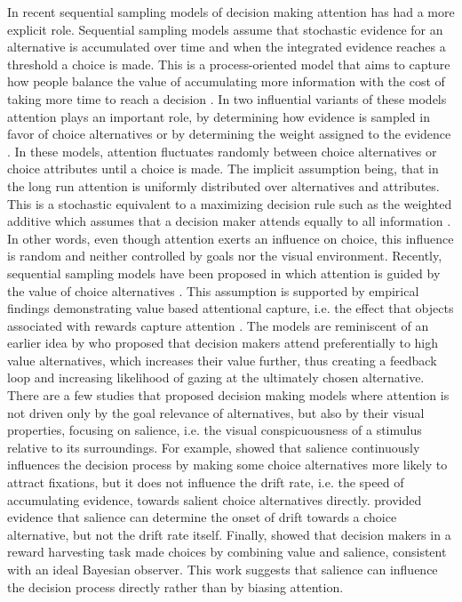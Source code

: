 \documentclass[english,natbib,man,floatsintext]{apa6}
\begin{document}
In recent sequential sampling models of decision making attention has had a more explicit role. Sequential sampling models assume that stochastic evidence for an alternative is accumulated over time and when the integrated evidence reaches a threshold a choice is made. This is a process-oriented model that aims to capture how people balance the value of accumulating more information with the cost of taking more time to reach a decision \citep{forstmann2016}. In two influential variants of these models attention plays an important role, by determining how evidence is sampled in favor of choice alternatives \citep{busemeyer1992} or by determining the weight assigned to the evidence \citep{krajbich2010a, thomas2019}. In these models, attention fluctuates randomly between choice alternatives or choice attributes until a choice is made. The implicit assumption being, that in the long run attention is uniformly distributed over alternatives and attributes. This is a stochastic equivalent to a maximizing decision rule such as the weighted additive which assumes that a decision maker attends equally to all information \cite{gloeckner2011a, payne1988}. In other words, even though attention exerts an influence on choice, this influence is random and neither controlled by goals nor the visual environment. Recently, sequential sampling models have been proposed in which attention is guided by the value of choice alternatives \citep{callaway2019a, gluth2018, gluth2020}. This assumption is supported by empirical findings demonstrating value based attentional capture, i.e. the effect that objects associated with rewards capture attention \citep{lepelley2015}. The models are reminiscent of an earlier idea by \cite{shimojo2003a} who proposed that decision makers attend preferentially to high value alternatives, which increases their value further, thus creating a feedback loop and increasing likelihood of gazing at the ultimately chosen alternative.\\ 

There are a few studies that proposed decision making models where attention is not driven only by the goal relevance of alternatives, but also by their visual properties, focusing on salience, i.e. the visual conspicuousness of a stimulus relative to its surroundings. For example, \cite{towal2013a} showed that salience continuously influences the decision process by making some choice alternatives more likely to attract fixations, but it does not influence the drift rate, i.e. the speed of accumulating evidence, towards salient choice alternatives directly. \cite{chen2013} provided evidence that salience can determine the onset of drift towards a choice alternative, but not the drift rate itself. Finally, \cite{navalpakkam2010} showed that decision makers in a reward harvesting task made choices by combining value and salience, consistent with an ideal Bayesian observer. This work suggests that salience can influence the decision process directly rather than by biasing attention.\\ 
\end{document}
